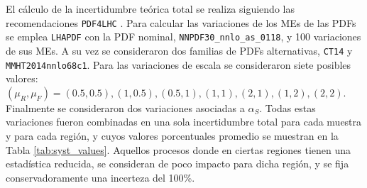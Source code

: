 El cálculo de la incertidumbre teórica total se realiza siguiendo las recomendaciones \texttt{PDF4LHC} \cite{Butterworth:2015oua}.
Para calcular las variaciones de los MEs de las PDFs se emplea \texttt{LHAPDF} \cite{lhapdf} con la PDF nominal, \texttt{NNPDF30\_nnlo\_as\_0118}, y 100 variaciones de sus MEs. A su vez se consideraron dos familias de PDFs alternativas, \texttt{CT14} y \texttt{MMHT2014nnlo68c1}. Para las variaciones de escala se consideraron siete posibles valores: $(\mu_R, \mu_F) = (0.5,0.5), (1,0.5), (0.5,1), (1,1), (2,1), (1,2), (2,2)$. Finalmente se consideraron dos variaciones asociadas a $\alpha_S$. Todas estas variaciones fueron combinadas en una sola incertidumbre total para cada muestra y para cada región, y cuyos valores porcentuales promedio se muestran en la Tabla \ref{tab:syst_values}. Aquellos procesos donde en ciertas regiones tienen una estadística reducida, se consideran de poco impacto para dicha región, y se fija conservadoramente una incerteza del 100\%.

\begin{table}[ht!]
  \centering
  \caption{Promedio porcentual entre la variación superior e inferior de las incertidumbres teóricas de cada muestra de fondo en cada región. Los fondos con baja estadística no afectan los resultados en la región y sus incertidumbres se fijan conservadoramente a 100\%.
  }
\label{tab:syst_values}
\end{table}

